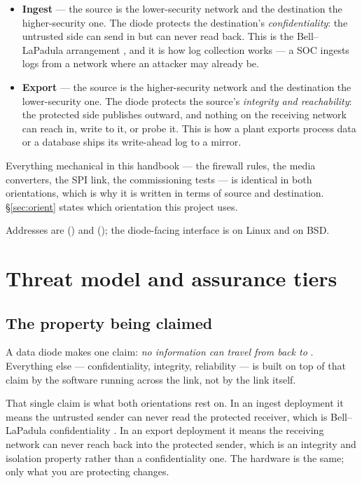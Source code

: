 \documentclass[11pt,a4paper]{article}
\begin{document}
\begin{itemize}
\item \textbf{Ingest} --- the source is the lower-security network and the
      destination the higher-security one. The diode protects the
      destination's \emph{confidentiality}: the untrusted side can send in but
      can never read back. This is the Bell--LaPadula arrangement
      \cite{bell1976}, and it is how log collection works --- a SOC ingests
      logs from a network where an attacker may already be.
\item \textbf{Export} --- the source is the higher-security network and the
      destination the lower-security one. The diode protects the source's
      \emph{integrity and reachability}: the protected side publishes outward,
      and nothing on the receiving network can reach in, write to it, or probe
      it. This is how a plant exports process data or a database ships its
      write-ahead log to a mirror.
\end{itemize}

Everything mechanical in this handbook --- the firewall rules, the media
converters, the SPI link, the commissioning tests --- is identical in both
orientations, which is why it is written in terms of source and destination.
\S\ref{sec:orient} states which orientation this project uses.

Addresses are  (\srcside{}) and 
(\dstside{}); the diode-facing interface is  on Linux and
 on BSD.

\section{Threat model and assurance tiers}
\label{sec:threat}

\subsection{The property being claimed}

A data diode makes one claim: \emph{no information can travel from
\dstside{} back to \srcside{}}. Everything else --- confidentiality,
integrity, reliability --- is built on top of that claim by the software
running across the link, not by the link itself.

That single claim is what both orientations rest on. In an ingest deployment
it means the untrusted sender can never read the protected receiver, which is
Bell--LaPadula confidentiality \cite{bell1976}. In an export deployment it
means the receiving network can never reach back into the protected sender,
which is an integrity and isolation property rather than a confidentiality
one. The hardware is the same; only what you are protecting changes.
\end{document}
